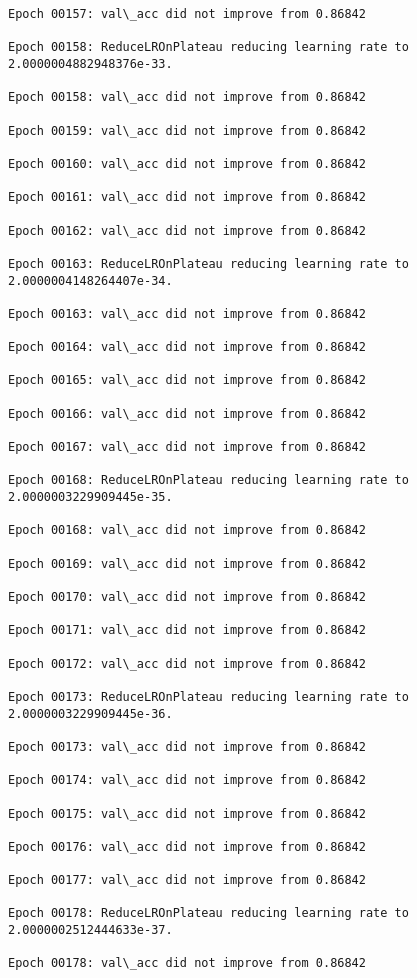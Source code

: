 \documentclass[11pt]{article}
\begin{document}
\begin{Verbatim}[commandchars=\\\{\}]
Epoch 00157: val\_acc did not improve from 0.86842

Epoch 00158: ReduceLROnPlateau reducing learning rate to 2.0000004882948376e-33.

Epoch 00158: val\_acc did not improve from 0.86842

Epoch 00159: val\_acc did not improve from 0.86842

Epoch 00160: val\_acc did not improve from 0.86842

Epoch 00161: val\_acc did not improve from 0.86842

Epoch 00162: val\_acc did not improve from 0.86842

Epoch 00163: ReduceLROnPlateau reducing learning rate to 2.0000004148264407e-34.

Epoch 00163: val\_acc did not improve from 0.86842

Epoch 00164: val\_acc did not improve from 0.86842

Epoch 00165: val\_acc did not improve from 0.86842

Epoch 00166: val\_acc did not improve from 0.86842

Epoch 00167: val\_acc did not improve from 0.86842

Epoch 00168: ReduceLROnPlateau reducing learning rate to 2.0000003229909445e-35.

Epoch 00168: val\_acc did not improve from 0.86842

Epoch 00169: val\_acc did not improve from 0.86842

Epoch 00170: val\_acc did not improve from 0.86842

Epoch 00171: val\_acc did not improve from 0.86842

Epoch 00172: val\_acc did not improve from 0.86842

Epoch 00173: ReduceLROnPlateau reducing learning rate to 2.0000003229909445e-36.

Epoch 00173: val\_acc did not improve from 0.86842

Epoch 00174: val\_acc did not improve from 0.86842

Epoch 00175: val\_acc did not improve from 0.86842

Epoch 00176: val\_acc did not improve from 0.86842

Epoch 00177: val\_acc did not improve from 0.86842

Epoch 00178: ReduceLROnPlateau reducing learning rate to 2.0000002512444633e-37.

Epoch 00178: val\_acc did not improve from 0.86842


\end{Verbatim}
\end{document}

